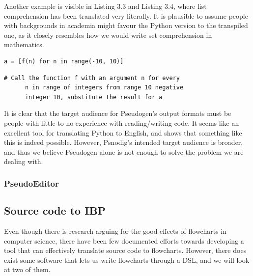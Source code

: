 Another example is visible in Listing 3.3 and Listing 3.4, where list comprehension has been translated very literally. It is plausible to assume people with backgrounds in academia might favour the Python version to the transpiled one, as it closely resembles how we would write set comprehension in mathematics. \hfill \\

\begin{lstlisting}[caption={A list comprehension of applying f(n) to integers in the range -10 to 10, and placing the results in a list}, captionpos=b, frame=trbl]
    a = [f(n) for n in range(-10, 10)]
\end{lstlisting}

\begin{lstlisting}[caption={The result of transpiling the code in Listing ?? with Pseudogen}, captionpos=b, frame=trbl]
    # Call the function f with an argument n for every
      n in range of integers from range 10 negative
      integer 10, substitute the result for a
\end{lstlisting}

It is clear that the target audience for Pseudogen's output formats must be people with little to no experience with reading/writing code. It seems like an excellent tool for translating Python to English, and shows that something like this is indeed possible. However, Psnodig's intended target audience is broader, and thus we believe Pseudogen alone is not enough to solve the problem we are dealing with.

\subsubsection{PseudoEditor}



\subsection{Source code to IBP}

Even though there is research arguing for the good effects of flowcharts in computer science, there have been few documented efforts towards developing a tool that can effectively translate source code to flowcharts. However, there does exist some software that lets us write flowcharts through a DSL, and we will look at two of them.

